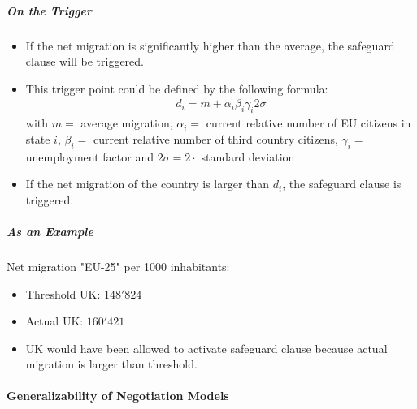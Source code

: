 \subparagraph{On the Trigger}

\begin{itemize}
    \item If the net migration is significantly higher than the average, the
        safeguard clause will be triggered.
    \item This trigger point could be defined by the following formula:
        \begin{align*}
            d_i = m + \alpha_i \beta_i \gamma_i 2 \sigma
        \end{align*}
        with $m=$ average migration, $\alpha_i =$ current relative number
        of EU citizens in state $i$, $\beta_i =$ current relative number
        of third country citizens, $\gamma_i =$ unemployment factor and
        $2 \sigma = 2 \cdot$ standard deviation
    \item If the net migration of the country is larger than $d_i$, the
        safeguard clause is triggered.
\end{itemize}

\subparagraph{As an Example}

Net migration "EU-25" per 1000 inhabitants:
\begin{itemize}
    \item Threshold UK: $148'824$
    \item Actual UK: $160'421$
    \item UK would have been allowed to activate safeguard clause because
        actual migration is larger than threshold.
\end{itemize}


\paragraph{Generalizability of Negotiation Models}

